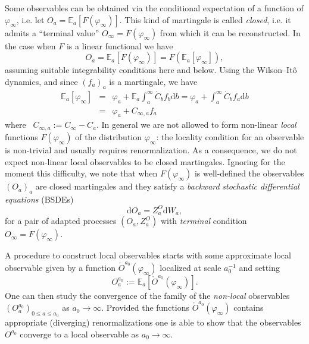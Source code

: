 \documentclass[reprint,aps]{revtex4-2}
\newcommand{\assign}{:=}
\newcommand{\mathd}{\mathrm{d}}
\newcommand{\tmtextit}[1]{\textit{{{#1}}}}
\newcommand{\bbE}{\mathbb{E}}
\begin{document}
Some observables can be obtained via the conditional expectation of a function
of $\varphi_{\infty}$, i.e. let $O_a =\mathbb{E}_a [F (\varphi_{\infty})]$.
This kind of martingale is called \tmtextit{closed}, i.e. it admits a
``terminal value'' $O_{\infty} = F (\varphi_{\infty})$ from which it can be
reconstructed. In the case when $F$ is a linear functional we have
\[ O_a =\mathbb{E}_a [F (\varphi_{\infty})] = F (\mathbb{E}_a
   [\varphi_{\infty}]), \]
assuming suitable integrability conditions here and below. Using the
Wilson--It{\^o} dynamics, and since $(f_a)_a$ is a martingale, we have
\begin{equation}
  \begin{array}{lll}
    \mathbb{E}_a [\varphi_{\infty}] & = & \varphi_a +\mathbb{E}_a
    \int_a^{\infty} \dot{C}_b f_b \mathd b = \varphi_a + \int_a^{\infty}
    \dot{C}_b f_a \mathd b\\
    & = & \varphi_a + C_{\infty, a} f_a
  \end{array} \label{eq:lin-comp}
\end{equation}
where \ $C_{\infty, a} \assign C_{\infty} - C_a$. In general we are not
allowed to form non-linear \tmtextit{local} functions $F (\varphi_{\infty})$
of the distribution $\varphi_{\infty}$: the locality condition for an
observable is non-trivial and usually requires renormalization. As a
consequence, we do not expect non-linear local observables to be closed
martingales. Ignoring for the moment this difficulty, we note that when $F
(\varphi_{\infty})$ is well-defined the observables $(O_a)_a$ are closed
martingales and they satisfy a \tmtextit{backward} \tmtextit{stochastic
differential equations}
(BSDEs)~{\cite{maForwardBackwardStochasticDifferential2007}}
\[ \mathd O_a = Z^O_a \mathd W_a, \]
for a pair of adapted processes $(O_a, Z^O_a)$ with \tmtextit{terminal}
condition $O_{\infty} = F (\varphi_{\infty})$.

A procedure to construct local observables starts with some approximate local
observable given by a function $\ring{O}^{a_0} (\varphi_{\infty})$ localized
at scale $a_0^{- 1}$ and setting
\[ O^{a_0}_a \assign \bbE_a [\ring{O}^{a_0} (\varphi_{\infty})] . \]
One can then study the convergence of the family of the \tmtextit{non-local}
observables $(O^{a_0}_a)_{0 \leqslant a \leqslant a_0}$ as $a_0 \rightarrow
\infty$. Provided the functions $\ring{O}^{a_0} (\varphi_{\infty})$ contains
appropriate (diverging) renormalizations one is able to show that the
observables $O^{a_0}$ converge to a local observable as $a_0 \rightarrow
\infty$.
\end{document}
